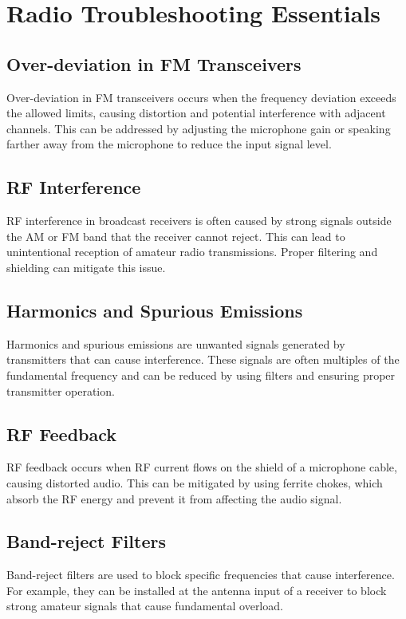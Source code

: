 \section{Radio Troubleshooting Essentials}
\label{section:radio_troubleshooting}

\subsection*{Over-deviation in FM Transceivers}
Over-deviation in FM transceivers occurs when the frequency deviation exceeds the allowed limits, causing distortion and potential interference with adjacent channels. This can be addressed by adjusting the microphone gain or speaking farther away from the microphone to reduce the input signal level.

\subsection*{RF Interference}
RF interference in broadcast receivers is often caused by strong signals outside the AM or FM band that the receiver cannot reject. This can lead to unintentional reception of amateur radio transmissions. Proper filtering and shielding can mitigate this issue.

\subsection*{Harmonics and Spurious Emissions}
Harmonics and spurious emissions are unwanted signals generated by transmitters that can cause interference. These signals are often multiples of the fundamental frequency and can be reduced by using filters and ensuring proper transmitter operation.

\subsection*{RF Feedback}
RF feedback occurs when RF current flows on the shield of a microphone cable, causing distorted audio. This can be mitigated by using ferrite chokes, which absorb the RF energy and prevent it from affecting the audio signal.

\subsection*{Band-reject Filters}
Band-reject filters are used to block specific frequencies that cause interference. For example, they can be installed at the antenna input of a receiver to block strong amateur signals that cause fundamental overload.

